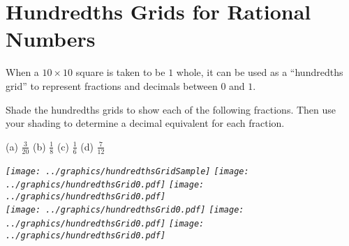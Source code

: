 \newpage
\section{Hundredths Grids for Rational Numbers}\label{A:hundredthsGrids}


When a $10\times 10$ square is taken to be $1$ whole, it can be used as a ``hundredths grid'' 
to represent fractions and decimals between $0$ and $1$.

\begin{prob}
Shade the hundredths grids to show each of the following fractions.  Then use your shading to determine a decimal equivalent for each fraction.  
\begin{center}
\hfill (a) $\frac{3}{20}$ \hfill (b) $\frac{1}{8}$ \hfill (c) $\frac{1}{6}$ \hfill (d) $\frac{7}{12}$ \hfill
\end{center}

\begin{fullwidth}\em\em\quad
\texttt{[image: ../graphics/hundredthsGridSample]}\quad
\texttt{[image: ../graphics/hundredthsGrid0.pdf]}\quad
\texttt{[image: ../graphics/hundredthsGrid0.pdf]}\\

\texttt{[image: ../graphics/hundredthsGrid0.pdf]}\quad
\texttt{[image: ../graphics/hundredthsGrid0.pdf]}\quad
\texttt{[image: ../graphics/hundredthsGrid0.pdf]}
\end{fullwidth}

\end{prob}


